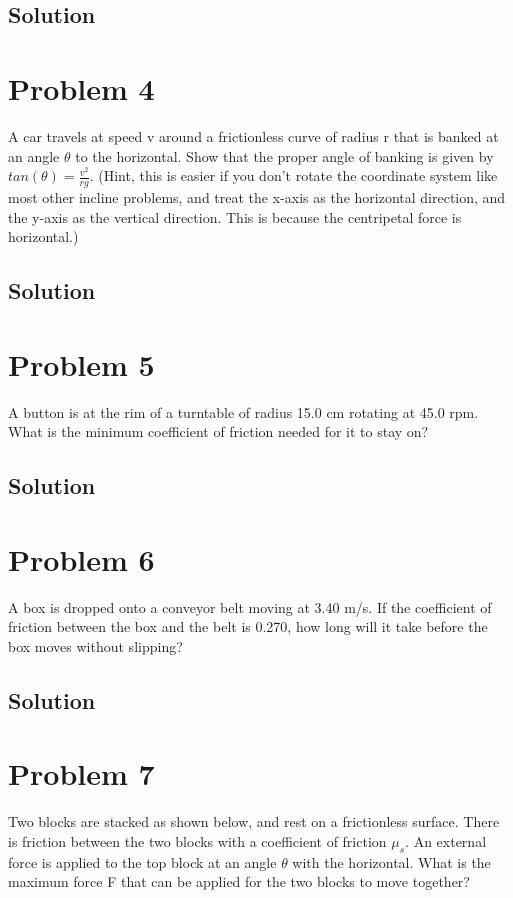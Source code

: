 \documentclass[12pt]{article}
\begin{document}
\subsection*{Solution}


\pagebreak
\section*{Problem 4}
A car travels at speed v around a frictionless curve of radius r that is banked at an angle $\theta$ to the horizontal. Show that the proper angle of banking is given by $tan(\theta) = \frac{v^2}{rg}$. (Hint, this is easier if you don't rotate the coordinate system like most other incline problems, and treat the x-axis as the horizontal direction, and the y-axis as the vertical direction. This is because the centripetal force is horizontal.)

\subsection*{Solution}


\pagebreak
\section*{Problem 5}
A button is at the rim of a turntable of radius 15.0 cm rotating at 45.0 rpm. What is the minimum coefficient of friction needed for it to stay on?

\subsection*{Solution}


\pagebreak
\section*{Problem 6}
A box is dropped onto a conveyor belt moving at 3.40 m/s. If the coefficient of friction between the box and the belt is 0.270, how long will it take before the box moves without slipping?

\subsection*{Solution}


\pagebreak
\section*{Problem 7}
Two blocks are stacked as shown below, and rest on a frictionless surface. There is friction between the two blocks with a coefficient of friction $\mu_s$. An external force is applied to the top block at an angle $\theta$ with the horizontal. What is the maximum force F that can be applied for the two blocks to move together?
\end{document}

